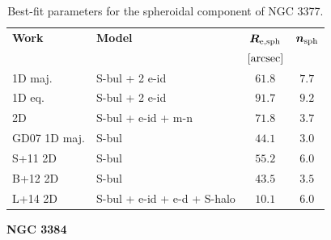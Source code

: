 \documentclass[preprint2]{emulateapj}
\begin{document}
  \begin{table}[h]
  \small
  \caption{Best-fit parameters for the spheroidal component of NGC 3377.}
  \begin{center}
  \begin{tabular}{llcc}
  \hline
  {\bf Work} & {\bf Model}   & $\bm R_{\rm e,sph}$    & $\bm n_{\rm sph}$ \\
    &  &  $[\rm arcsec]$ & \\
  \hline
  1D maj. & S-bul + 2 e-id     & $61.8$  &  $7.7$ \\
  1D eq.  & S-bul + 2 e-id     & $91.7$  &  $9.2$ \\
  2D      & S-bul + e-id + m-n & $71.8$  &  $3.7$ \\
  \hline
  GD07 1D maj.         & S-bul     		     & $44.1$  &  $3.0$ \\
  S+11 2D         & S-bul     		     & $55.2$  &  $6.0$ \\
  B+12 2D         & S-bul     		     & $43.5$  &  $3.5$ \\
  L+14 2D         & S-bul + e-id + e-d + S-halo & $10.1$  &  $6.0$ \\
  \hline
  \end{tabular}
  \end{center}
  \label{tab:n3377}
  \end{table}
  

  \clearpage\newpage\noindent
  {\bf NGC 3384 \\}
\end{document}
